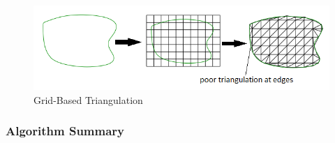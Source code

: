 \documentclass{article}
\begin{document}
\begin{figure}
	\centering
	\includegraphics[scale=0.6]{figures/grid-based-triangulation.png}
	\caption{Grid-Based Triangulation}
	\label{fig:grid-based-triangulation}
\end{figure}

\subsubsection{Algorithm Summary}
\end{document}
